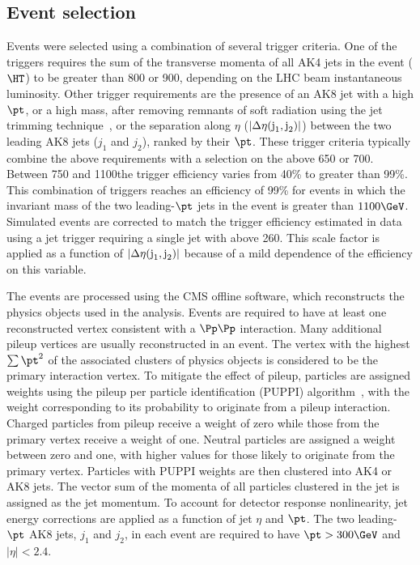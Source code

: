 \subsection{Event selection\label{sec:EvtSel}}

Events were selected using a combination of several trigger
criteria.  One of the triggers requires the sum of the transverse
momenta of all AK4 jets in the event ($\HT$) to be greater than 800
or 900\GeV, depending on the LHC beam instantaneous luminosity. 
Other trigger requirements are the presence of an AK8 jet with a high $\pt$, or a high mass, after removing remnants of soft radiation using the jet trimming technique~\cite{Krohn:2009th}, or the separation along $\eta$ ($|\Delta\eta(\text{j}_{1}, \text{j}_{2})|$) between the two leading AK8 jets ($j_{1}$ and $j_{2}$), ranked by their $\pt$.
These trigger criteria typically combine the above requirements with a selection on the \HT above 650 or 700\GeV.  Between 750 and 1100\GeV the trigger efficiency varies from 40\% to greater than 99\%.  
This combination of triggers reaches an efficiency of 99\% for events in which the
invariant mass of the two leading-$\pt$ jets in the event is greater than
$1100\GeV$.  Simulated events are corrected to match the trigger
efficiency estimated in data using a jet trigger requiring a single
jet with \pt above 260\GeV. This scale factor is applied as a function
of $|\Delta\eta(\text{j}_{1}, \text{j}_{2})|$ because of a mild dependence of the efficiency on this variable.

The events are processed using the CMS offline
software, which reconstructs the physics objects used in the
analysis. Events are required to have at least one reconstructed
vertex consistent with a $\Pp\Pp$ interaction. Many additional pileup
vertices are usually reconstructed in an event. The vertex with the
highest $\sum\pt^{2}$ of the associated clusters of physics objects is
considered to be the primary interaction vertex. To mitigate the
effect of pileup, particles are assigned weights using the pileup per
particle identification (PUPPI) algorithm~\cite{PUPPI}, with the
weight corresponding to its probability to originate from a pileup
interaction. Charged particles from pileup receive a weight of zero while
those from the primary vertex receive a weight of one. Neutral particles
are assigned a weight between zero and one, with higher values for those
likely to originate from the primary vertex. Particles with PUPPI weights are
then clustered into AK4 or AK8 jets. The vector sum of the momenta of
all particles clustered in the jet is assigned as the jet momentum. To
account for detector response nonlinearity, jet energy corrections are applied
as a function of jet $\eta$ and $\pt$. The two leading-$\pt$ AK8 jets,
$j_{1}$ and $j_{2}$, in each event are required to have $\pt > 300\GeV$
and $|\eta| < 2.4$.

